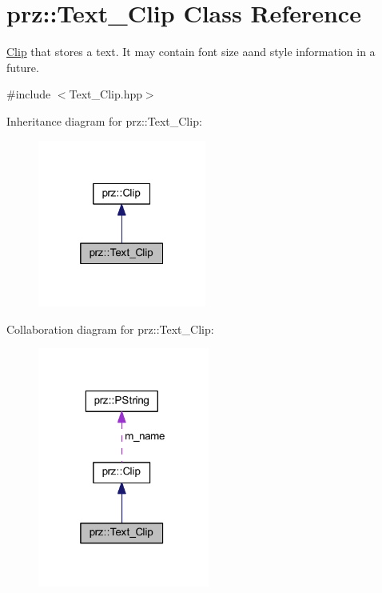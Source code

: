 \hypertarget{classprz_1_1_text___clip}{}\section{prz\+::Text\+\_\+\+Clip Class Reference}
\label{classprz_1_1_text___clip}


\mbox{\hyperlink{classprz_1_1_clip}{Clip}} that stores a text. It may contain font size aand style information in a future.  




{\ttfamily \#include $<$Text\+\_\+\+Clip.\+hpp$>$}



Inheritance diagram for prz\+::Text\+\_\+\+Clip\+:
\nopagebreak
\begin{figure}[H]
\begin{center}
\leavevmode
\includegraphics[width=157pt]{classprz_1_1_text___clip__inherit__graph}
\end{center}
\end{figure}


Collaboration diagram for prz\+::Text\+\_\+\+Clip\+:
\nopagebreak
\begin{figure}[H]
\begin{center}
\leavevmode
\includegraphics[width=160pt]{classprz_1_1_text___clip__coll__graph}
\end{center}
\end{figure}
